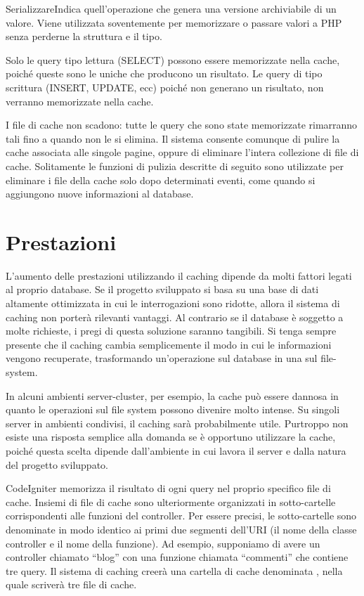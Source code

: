 \begin{deftabv}{Serializzare}{Indica quell'operazione che genera una versione archiviabile di un valore. Viene utilizzata soventemente per memorizzare o passare valori a PHP senza perderne la struttura e il tipo.}
\end{deftabv}

Solo le query tipo lettura (SELECT) possono essere memorizzate nella cache, poiché queste sono le uniche che producono un risultato. Le query di tipo scrittura (INSERT, UPDATE, ecc) poiché non generano un risultato, non verranno memorizzate nella cache.

I file di cache non scadono: tutte le query che sono state memorizzate rimarranno tali fino a quando non le si elimina. Il sistema consente comunque di pulire la cache associata alle singole pagine, oppure di eliminare l'intera collezione di file di cache. Solitamente le funzioni di pulizia descritte di seguito sono utilizzate per eliminare i file della cache solo dopo determinati eventi, come quando si aggiungono nuove informazioni al database.

\section*{Prestazioni}
L'aumento delle prestazioni utilizzando il caching dipende da molti fattori legati al proprio database. Se il progetto sviluppato si basa su una base di dati altamente ottimizzata in cui le interrogazioni sono ridotte, allora il sistema di caching non porterà rilevanti vantaggi. Al contrario se il database è soggetto a molte richieste, i pregi di questa soluzione saranno tangibili. Si tenga sempre presente che il caching cambia semplicemente il modo in cui le informazioni vengono recuperate, trasformando un'operazione sul database in una sul file-system.

In alcuni ambienti server-cluster, per esempio, la cache può essere dannosa in quanto le operazioni sul file system possono divenire molto intense. Su singoli server in ambienti condivisi, il caching sarà probabilmente utile. Purtroppo non esiste una risposta semplice alla domanda se è opportuno utilizzare la cache, poiché questa scelta dipende dall'ambiente in cui lavora il server e dalla natura del progetto sviluppato.

CodeIgniter memorizza il risultato di ogni query nel proprio specifico file di cache. Insiemi di file di cache sono ulteriormente organizzati in sotto-cartelle corrispondenti alle funzioni del controller. Per essere precisi, le sotto-cartelle sono denominate in modo identico ai primi due segmenti dell'\ac{URI} (il nome della classe controller e il nome della funzione). Ad esempio, supponiamo di avere un controller chiamato ``blog'' con una funzione chiamata ``commenti'' che contiene tre query. Il sistema di caching creerà una cartella di cache denominata , nella quale scriverà tre file di cache.


